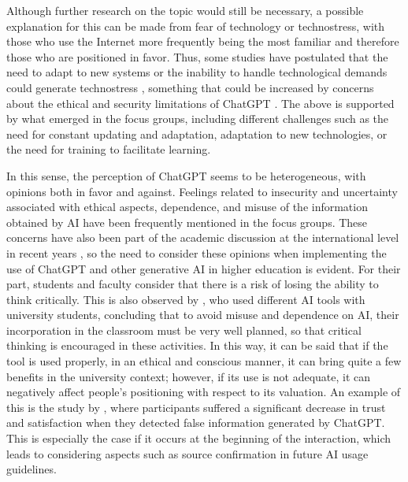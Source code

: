 \documentclass[english]{textolivre}
\begin{document}
Although further research on the topic would still be necessary, a possible explanation for this can be made from fear of technology or technostress, with those who use the Internet more frequently being the most familiar and therefore those who are positioned in favor. Thus, some studies have postulated that the need to adapt to new systems or the inability to handle technological demands could generate technostress \cite{tarafdar2010technostress}, something that could be increased by concerns about the ethical and security limitations of ChatGPT \cite{hua2024limitations}. The above is supported by what emerged in the focus groups, including different challenges such as the need for constant updating and adaptation, adaptation to new technologies, or the need for training to facilitate learning.

In this sense, the perception of ChatGPT seems to be heterogeneous, with opinions both in favor and against. Feelings related to insecurity and uncertainty associated with ethical aspects, dependence, and misuse of the information obtained by AI have been frequently mentioned in the focus groups. These concerns have also been part of the academic discussion at the international level in recent years \cite{kamalov2023newera,ma2023ethical,swindell2024artificial}, so the need to consider these opinions when implementing the use of ChatGPT and other generative AI in higher education is evident. For their part, students and faculty consider that there is a risk of losing the ability to think critically. This is also observed by \textcite{ruizrojas2024collaborative}, who used different AI tools with university students, concluding that to avoid misuse and dependence on AI, their incorporation in the classroom must be very well planned, so that critical thinking is encouraged in these activities. In this way, it can be said that if the tool is used properly, in an ethical and conscious manner, it can bring quite a few benefits in the university context; however, if its use is not adequate, it can negatively affect people’s positioning with respect to its valuation. An example of this is the study by \textcite{amaro2024believe}, where participants suffered a significant decrease in trust and satisfaction when they detected false information generated by ChatGPT. This is especially the case if it occurs at the beginning of the interaction, which leads to considering aspects such as source confirmation in future AI usage guidelines.
\end{document}
